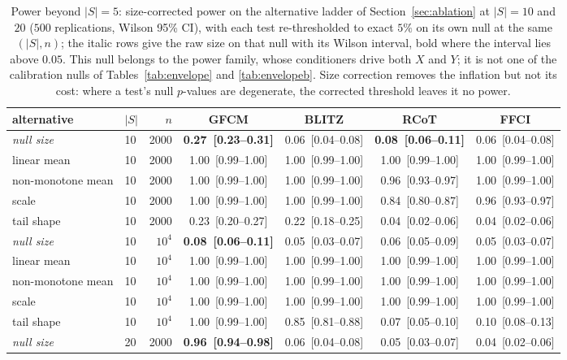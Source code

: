\begin{table}[t]\centering\small
\caption{Power beyond $|S|=5$: size-corrected power on the alternative ladder of Section~\ref{sec:ablation} at $|S|=10$ and $20$ ($500$ replications, Wilson 95\% CI), with each test re-thresholded to exact $5\%$ on its own null at the same $(|S|,n)$; the italic rows give the raw size on that null with its Wilson interval, bold where the interval lies above $0.05$. This null belongs to the power family, whose conditioners drive both $X$ and $Y$; it is not one of the calibration nulls of Tables~\ref{tab:envelope} and \ref{tab:envelopeb}. Size correction removes the inflation but not its cost: where a test's null $p$-values are degenerate, the corrected threshold leaves it no power.}
\label{tab:deeppower}
\begin{tabular}{llrcccc}
\toprule
alternative & $|S|$ & $n$ & \textbf{GFCM} & BLITZ & RCoT & FFCI \\
\midrule
\emph{null size} & 10 & 2000 & \textbf{0.27~[0.23--0.31]} & 0.06~[0.04--0.08] & \textbf{0.08~[0.06--0.11]} & 0.06~[0.04--0.08] \\
linear mean & 10 & 2000 & 1.00~[0.99--1.00] & 1.00~[0.99--1.00] & 1.00~[0.99--1.00] & 1.00~[0.99--1.00] \\
non-monotone mean & 10 & 2000 & 1.00~[0.99--1.00] & 1.00~[0.99--1.00] & 0.96~[0.93--0.97] & 1.00~[0.99--1.00] \\
scale & 10 & 2000 & 1.00~[0.99--1.00] & 1.00~[0.99--1.00] & 0.84~[0.80--0.87] & 0.96~[0.93--0.97] \\
tail shape & 10 & 2000 & 0.23~[0.20--0.27] & 0.22~[0.18--0.25] & 0.04~[0.02--0.06] & 0.04~[0.02--0.06] \\
\midrule
\emph{null size} & 10 & $10^4$ & \textbf{0.08~[0.06--0.11]} & 0.05~[0.03--0.07] & 0.06~[0.05--0.09] & 0.05~[0.03--0.07] \\
linear mean & 10 & $10^4$ & 1.00~[0.99--1.00] & 1.00~[0.99--1.00] & 1.00~[0.99--1.00] & 1.00~[0.99--1.00] \\
non-monotone mean & 10 & $10^4$ & 1.00~[0.99--1.00] & 1.00~[0.99--1.00] & 1.00~[0.99--1.00] & 1.00~[0.99--1.00] \\
scale & 10 & $10^4$ & 1.00~[0.99--1.00] & 1.00~[0.99--1.00] & 1.00~[0.99--1.00] & 1.00~[0.99--1.00] \\
tail shape & 10 & $10^4$ & 1.00~[0.99--1.00] & 0.85~[0.81--0.88] & 0.07~[0.05--0.10] & 0.10~[0.08--0.13] \\
\midrule
\emph{null size} & 20 & 2000 & \textbf{0.96~[0.94--0.98]} & 0.06~[0.04--0.08] & 0.05~[0.03--0.07] & 0.04~[0.02--0.06] \\

\end{tabular}
\end{table}
